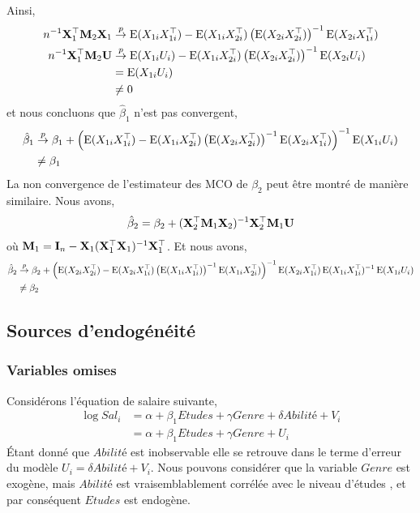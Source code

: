 	Ainsi,
	\begin{align*}
	n^{-1}\mathbf X_1^\top\mathbf M_2\mathbf X_1 &\overset{p}{\rightarrow} \operatorname{E}(X_{1i}X_{1i}^\top)-\operatorname{E}(X_{1i}X_{2i}^\top)\left( \operatorname{E}(X_{2i}X_{2i}^\top)\right)^{-1}\operatorname{E}(X_{2i}X_{1i}^\top)\\
	n^{-1}\mathbf X_1^\top\mathbf M_2\mathbf U &\overset{p}{\rightarrow} \operatorname{E}(X_{1i}U_i) - \operatorname{E}(X_{1i}X_{2i}^\top)\left( \operatorname{E}(X_{2i}X_{2i}^\top)\right)^{-1}\operatorname{E}(X_{2i}U_i)\\
	&=\operatorname{E}(X_{1i}U_i) \\
	&\neq 0
	\end{align*}
	et nous concluons que $\hat{\beta}_1 $ n'est pas convergent,
	\begin{align*}
	\hat{\beta}_1 &\overset{p}{\rightarrow} \beta_1 + \left(\operatorname{E}(X_{1i}X_{1i}^\top)-\operatorname{E}(X_{1i}X_{2i}^\top)\left( \operatorname{E}(X_{2i}X_{2i}^\top)\right)^{-1}\operatorname{E}(X_{2i}X_{1i}^\top)\right)^{-1}\operatorname{E}(X_{1i}U_i)\\
	&\neq \beta_1
	\end{align*}
	La non convergence de l'estimateur des MCO de $\beta_2$ peut être montré de manière similaire. Nous avons,
	\begin{align*}
	\hat{\beta}_2 = \beta_2 + (\mathbf X_2^\top\mathbf M_1\mathbf X_2)^{-1}\mathbf X_2^\top\mathbf M_1\mathbf U
	\end{align*}
	où $\mathbf M_1 = \mathbf{I}_n - \mathbf X_1(\mathbf X_1^\top\mathbf X_1)^{-1}\mathbf X_1^\top$. Et nous avons,
	\begin{align*}
	\hat{\beta}_2  &\overset{p}{\rightarrow} \beta_2 + \left(\operatorname{E}(X_{2i}X_{2i}^\top)-\operatorname{E}(X_{2i}X_{1i}^\top)\left( \operatorname{E}(X_{1i}X_{1i}^\top)\right)^{-1}\operatorname{E}(X_{1i}X_{2i}^\top)\right)^{-1}\operatorname{E}(X_{2i}X_{1i}^\top)\operatorname{E}(X_{1i}X_{1i}^\top)^{-1}\operatorname{E}(X_{1i}U_i)\\
	&\neq \beta_2
	\end{align*}

\subsection{Sources d'endogénéité}
\subsubsection*{Variables omises}
Considérons l'équation de salaire suivante,
\begin{align*}
\log Sal_i &= \alpha + \beta_1Etudes + \gamma Genre + \delta Abilité + V_i\\
&=\alpha + \beta_1Etudes + \gamma Genre + U_i
\end{align*}
\'Etant donné que $Abilité$ est inobservable elle se retrouve dans le terme d'erreur du modèle $U_i = \delta Abilité + V_i$. Nous pouvons considérer que la variable $Genre$ est exogène, mais $Abilité$ est vraisemblablement corrélée avec le niveau d'études , et par conséquent $Etudes$ est endogène.
